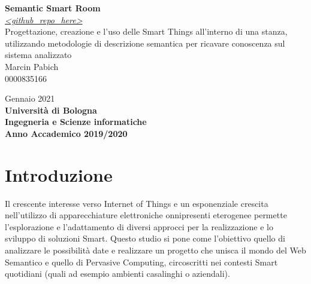 \documentclass[12pt,a4paper,openright,oneside]{report}
\begin{document}
\begin{titlepage}
	\begin{center}
		
		\vspace*{40mm}
		{\Large{\textbf{Semantic Smart Room}}}\\
		
		\vspace*{4mm}
		{\small{\textit{\url{<github_repo_here>}}}}\\
		
		\vspace*{4mm}
		{\Large{Progettazione, creazione e l'uso delle Smart Things all'interno di una stanza, utilizzando metodologie di descrizione semantica per ricavare conoscenza sul sistema analizzato}}\\
		
		\vspace{10mm}
		{\Large{Marcin Pabich\\}}
		{\large{0000835166}}
		
		\vspace{10mm}
		{\large{Gennaio 2021}}\\
		
		\vspace{20mm}
		{\large{\bf Università di Bologna}}\\
		\vspace{1mm}
		{\large{\bf Ingegneria e Scienze informatiche}}\\
		\vspace{1mm}
		{\large{\bf Anno Accademico 2019/2020}}
		\vspace*{\fill}
	\end{center}
\end{titlepage}
\tableofcontents                        %
\clearpage{\pagestyle{empty}\cleardoublepage}
\listoffigures                          %
\clearpage{\pagestyle{empty}\cleardoublepage}
\lstlistoflistings						%

\clearpage{\pagestyle{empty}\cleardoublepage}
\chapter{Introduzione}
Il crescente interesse verso Internet of Things e un esponenziale crescita nell'utilizzo di apparecchiature elettroniche onnipresenti eterogenee permette l'esplorazione e l'adattamento di diversi approcci per la realizzazione e lo sviluppo di soluzioni Smart. Questo studio si pone come l'obiettivo quello di analizzare le possibilità date e realizzare un progetto che unisca il mondo del Web Semantico e quello di Pervasive Computing, circoscritti nei contesti Smart quotidiani (quali ad esempio ambienti casalinghi o aziendali).\\
\end{document}
